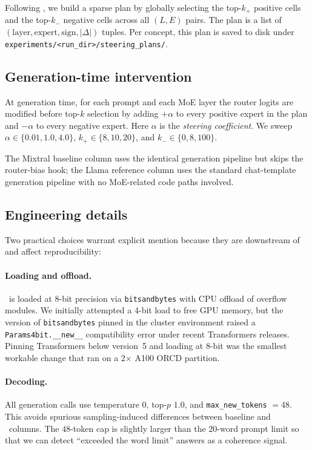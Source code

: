 Following \steermoe, we build a sparse plan by globally selecting the
top-$k_+$ positive cells and the top-$k_-$ negative cells across all
$(L, E)$ pairs. The plan is a list of
$(\text{layer}, \text{expert}, \text{sign}, |\Delta|)$ tuples. Per concept,
this plan is saved to disk under
\texttt{experiments/<run\_dir>/steering\_plans/}.

\subsection{Generation-time intervention}

At generation time, for each prompt and each MoE layer the router logits are
modified before top-$k$ selection by adding $+\alpha$ to every positive expert
in the plan and $-\alpha$ to every negative expert. Here $\alpha$ is the
\emph{steering coefficient}. We sweep $\alpha \in \{0.01, 1.0, 4.0\}$,
$k_+ \in \{8, 10, 20\}$, and $k_- \in \{0, 8, 100\}$.

The Mixtral baseline column uses the identical generation pipeline but skips
the router-bias hook; the Llama reference column uses the standard
chat-template generation pipeline with no MoE-related code paths involved.

\subsection{Engineering details}

Two practical choices warrant explicit mention because they are downstream of
\steermoe and affect reproducibility:

\paragraph{Loading and offload.}
\mixtral~is loaded at $8$-bit precision via \texttt{bitsandbytes} with CPU
offload of overflow modules. We initially attempted a $4$-bit load to free
GPU memory, but the version of \texttt{bitsandbytes} pinned in the cluster
environment raised a \texttt{Params4bit.\_\_new\_\_} compatibility error
under recent Transformers releases. Pinning Transformers below version~5 and
loading at $8$-bit was the smallest workable change that ran on a 2$\times$
A100 ORCD partition.

\paragraph{Decoding.}
All generation calls use temperature $0$, top-$p$ $1.0$, and
\texttt{max\_new\_tokens} $= 48$. This avoids spurious sampling-induced
differences between baseline and \steermoe~columns. The $48$-token cap is
slightly larger than the $20$-word prompt limit so that we can detect
``exceeded the word limit'' answers as a coherence signal.

